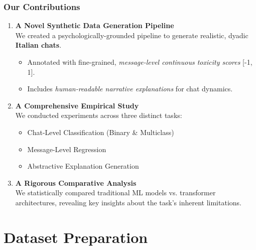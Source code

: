 \documentclass[aspectratio=169]{beamer}
\begin{document}
\begin{frame}
  \frametitle{Our Contributions}
  
  \begin{enumerate}
    \item \textbf{A Novel Synthetic Data Generation Pipeline} \\
    \pause
    We created a psychologically-grounded pipeline to generate realistic, dyadic \textbf{Italian chats}.
    \begin{itemize}
        \item Annotated with fine-grained, \textit{message-level continuous toxicity scores} [-1, 1].
        \item Includes \textit{human-readable narrative explanations} for chat dynamics.
    \end{itemize}
    \pause
    \item \textbf{A Comprehensive Empirical Study} \\
    \pause
    We conducted experiments across three distinct tasks:
    \begin{itemize}
        \item Chat-Level Classification (Binary \& Multiclass)
        \item Message-Level Regression
        \item Abstractive Explanation Generation
    \end{itemize}
    \pause
    \item \textbf{A Rigorous Comparative Analysis} \\
    \pause
    We statistically compared traditional ML models vs. transformer architectures, revealing key insights about the task's inherent limitations.
  \end{enumerate}
\end{frame}

\section{Dataset Preparation}

\end{document}

